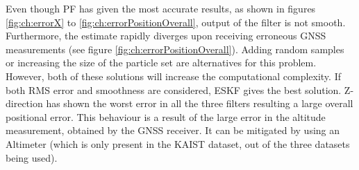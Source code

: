 Even though \gls{PF} has given the most accurate results, as shown in figures \ref{fig:ch:errorX} to \ref{fig:ch:errorPositionOverall}, output of the filter is not smooth. Furthermore, the estimate rapidly diverges upon receiving erroneous \gls{GNSS} measurements (see figure \ref{fig:ch:errorPositionOverall}). Adding random samples or increasing the size of the particle set are alternatives for this problem. However, both of these solutions will increase the computational complexity. If both \gls{RMS} error and smoothness are considered, \gls{ESKF} gives the best solution. Z-direction has shown the worst error in all the three filters resulting a large overall positional error. This behaviour is a result of the large error in the altitude measurement, obtained by the \gls{GNSS} receiver. It can be mitigated by using an Altimeter (which is only present in the \gls{KAIST} dataset, out of the three datasets being used).

